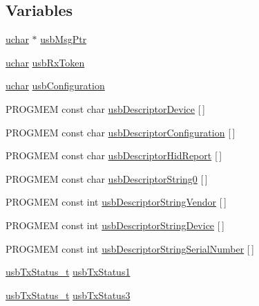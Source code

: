\subsection*{Variables}
\begin{DoxyCompactItemize}
\item 
\hyperlink{mhvlib-_vusb-_console_2vusb_2usbdrv_8h_aa8ddf20cdd716b652e76e23e5e700893}{uchar} $\ast$ \hyperlink{mhvlib-_vusb-_keyboard_2vusb_2usbdrv_8h_a5f78c8584830588b8c0c8f2a27772f8e}{usb\-Msg\-Ptr}
\item 
\hyperlink{mhvlib-_vusb-_console_2vusb_2usbdrv_8h_aa8ddf20cdd716b652e76e23e5e700893}{uchar} \hyperlink{mhvlib-_vusb-_keyboard_2vusb_2usbdrv_8h_ae2a9422baba7da8914129e0784ab2c05}{usb\-Rx\-Token}
\item 
\hyperlink{mhvlib-_vusb-_console_2vusb_2usbdrv_8h_aa8ddf20cdd716b652e76e23e5e700893}{uchar} \hyperlink{mhvlib-_vusb-_keyboard_2vusb_2usbdrv_8h_aa43502fd98afab29fcd5115c1f2c4067}{usb\-Configuration}
\item 
P\-R\-O\-G\-M\-E\-M const char \hyperlink{mhvlib-_vusb-_keyboard_2vusb_2usbdrv_8h_a1b8593e30029ecfd59a89335a12db631}{usb\-Descriptor\-Device} \mbox{[}$\,$\mbox{]}
\item 
P\-R\-O\-G\-M\-E\-M const char \hyperlink{mhvlib-_vusb-_keyboard_2vusb_2usbdrv_8h_a9a566690103d3a34df4893e7c0d3bf10}{usb\-Descriptor\-Configuration} \mbox{[}$\,$\mbox{]}
\item 
P\-R\-O\-G\-M\-E\-M const char \hyperlink{mhvlib-_vusb-_keyboard_2vusb_2usbdrv_8h_a66e1ec15fd4a4458927902d3764179af}{usb\-Descriptor\-Hid\-Report} \mbox{[}$\,$\mbox{]}
\item 
P\-R\-O\-G\-M\-E\-M const char \hyperlink{mhvlib-_vusb-_keyboard_2vusb_2usbdrv_8h_a367afe22c903b4b58805cc451c22cb99}{usb\-Descriptor\-String0} \mbox{[}$\,$\mbox{]}
\item 
P\-R\-O\-G\-M\-E\-M const int \hyperlink{mhvlib-_vusb-_keyboard_2vusb_2usbdrv_8h_aa92b0dfd57d302ff023bfb7ed868c2a1}{usb\-Descriptor\-String\-Vendor} \mbox{[}$\,$\mbox{]}
\item 
P\-R\-O\-G\-M\-E\-M const int \hyperlink{mhvlib-_vusb-_keyboard_2vusb_2usbdrv_8h_a1f252008bbf46a3172ebf8a4f8213a60}{usb\-Descriptor\-String\-Device} \mbox{[}$\,$\mbox{]}
\item 
P\-R\-O\-G\-M\-E\-M const int \hyperlink{mhvlib-_vusb-_keyboard_2vusb_2usbdrv_8h_a97aa1ed300e711b6eabb5cef561313a3}{usb\-Descriptor\-String\-Serial\-Number} \mbox{[}$\,$\mbox{]}
\item 
\hyperlink{mhvlib-_vusb-_keyboard_2vusb_2usbdrv_8h_ae6a25e02d49899e1862aa987a6c09ade}{usb\-Tx\-Status\-\_\-t} \hyperlink{mhvlib-_vusb-_keyboard_2vusb_2usbdrv_8h_a8787d5ad73afd0d305818dfbdce2bc85}{usb\-Tx\-Status1}
\item 
\hyperlink{mhvlib-_vusb-_keyboard_2vusb_2usbdrv_8h_ae6a25e02d49899e1862aa987a6c09ade}{usb\-Tx\-Status\-\_\-t} \hyperlink{mhvlib-_vusb-_keyboard_2vusb_2usbdrv_8h_a59db875c71a09a29e967500bdbfce4e0}{usb\-Tx\-Status3}
\end{DoxyCompactItemize}


